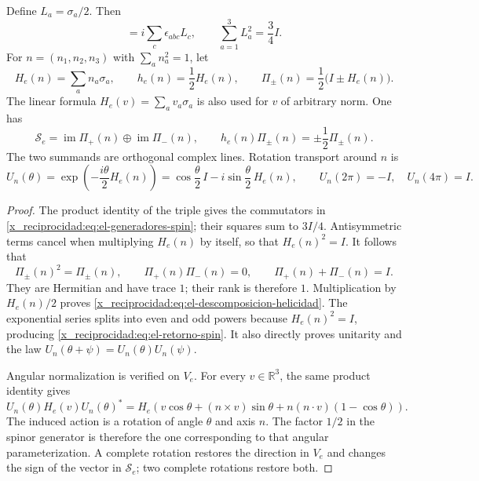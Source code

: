 \begin{proposition}
\label{x_reciprocidad:prop:el-helicidad}
Define \(L_a=\sigma_a/2\). Then
\begin{equation}
 [L_a,L_b]=i\sum_c\epsilon_{abc}L_c,
 \qquad \sum_{a=1}^3L_a^2=\frac34 I.
 \label{x_reciprocidad:eq:el-generadores-spin}
\end{equation}
For \(n=(n_1,n_2,n_3)\) with \(\sum_an_a^2=1\), let
\[
 H_e(n)=\sum_an_a\sigma_a,\qquad
 h_e(n)=\frac12H_e(n),\qquad
 \Pi_\pm(n)=\frac12\bigl(I\pm H_e(n)\bigr).
\]
The linear formula \(H_e(v)=\sum_av_a\sigma_a\) is also used
for \(v\) of arbitrary norm.
One has
\begin{equation}
 \mathscr S_e=\operatorname{im}\Pi_+(n)
             \mathbin{\oplus}\operatorname{im}\Pi_-(n),
 \qquad
 h_e(n)\Pi_\pm(n)=\pm\frac12\Pi_\pm(n).
 \label{x_reciprocidad:eq:el-descomposicion-helicidad}
\end{equation}
The two summands are orthogonal complex lines. Rotation
transport around \(n\) is
\begin{equation}
 U_n(\theta)=\exp\!\left(-\frac{i\theta}{2}H_e(n)\right)
 =\cos\frac\theta2\,I-i\sin\frac\theta2\,H_e(n),
 \qquad
 U_n(2\pi)=-I,\quad U_n(4\pi)=I.
 \label{x_reciprocidad:eq:el-retorno-spin}
\end{equation}
\end{proposition}
\begin{proof}
The product identity of the triple gives the commutators in
\eqref{x_reciprocidad:eq:el-generadores-spin}; their squares sum to \(3I/4\).
Antisymmetric terms cancel when multiplying
\(H_e(n)\) by itself, so that \(H_e(n)^2=I\).
It follows that
\[
 \Pi_\pm(n)^2=\Pi_\pm(n),\qquad
 \Pi_+(n)\Pi_-(n)=0,\qquad \Pi_+(n)+\Pi_-(n)=I.
\]
They are Hermitian and have trace \(1\); their rank is therefore \(1\).
Multiplication by \(H_e(n)/2\) proves
\eqref{x_reciprocidad:eq:el-descomposicion-helicidad}. The exponential series
splits into even and odd powers because \(H_e(n)^2=I\), producing
\eqref{x_reciprocidad:eq:el-retorno-spin}. It also directly proves
unitarity and the law \(U_n(\theta+\psi)=U_n(\theta)U_n(\psi)\).

Angular normalization is verified on \(V_e\). For every
\(v\in\mathbb R^3\), the same product identity gives
\[
 U_n(\theta)H_e(v)U_n(\theta)^*
 =H_e\!\left(v\cos\theta+(n\mathbin{\times}v)\sin\theta
       +n(n\mathbin{\cdot}v)(1-\cos\theta)\right).
\]
The induced action is a rotation of angle \(\theta\) and axis \(n\).
The factor \(1/2\) in the spinor generator is therefore the one
corresponding to that angular parameterization. A complete rotation restores
the direction in \(V_e\) and changes the sign of the vector in
\(\mathscr S_e\); two complete rotations restore both.
\end{proof}

